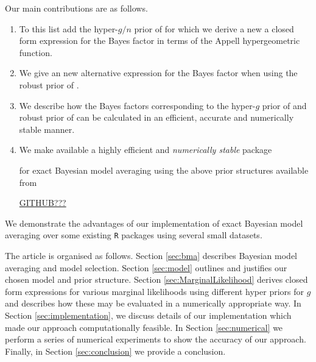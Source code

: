 \documentclass{article}[12pt]
\begin{document}
Our main contributions are as follows.
\begin{enumerate}
	\item To this list add the  hyper-$g/n$ prior of \cite{Liang2008} for which we
	derive a new
	a closed form expression for the Bayes factor in terms
	of the Appell hypergeometric function.
	
	\item We give an new alternative expression for the Bayes factor when using the
	robust prior of \cite{Bayarri2012}.
	
	\item We describe how the  Bayes factors corresponding to the hyper-$g$ prior of \cite{Liang2008} and robust 
	prior of \cite{Bayarri2012} can be calculated in an efficient, accurate and numerically stable manner.
	
	\item We make available a highly efficient and {\it numerically stable} package 
	

	for exact Bayesian model averaging
	using the above prior structures available from
	
	\begin{center}
	\url{GITHUB???}
	\end{center}
\end{enumerate}

\noindent 
We demonstrate the advantages of our implementation of exact Bayesian model
averaging over some existing {\tt R}
packages using several small datasets.



The article is organised as follows. Section \ref{sec:bma} describes Bayesian model averaging and model
selection. Section \ref{sec:model} outlines and justifies our chosen model and prior structure. Section 
\ref{sec:MarginalLikelihood} derives closed form expressions for various marginal likelihoods using 
different hyper priors for $g$ and describes how these may be evaluated in a numerically appropriate way.
In Section \ref{sec:implementation}, we discuss details of our implementation which made our approach 
computationally feasible.
In Section \ref{sec:numerical} we perform a series of numerical experiments to show the accuracy of our approach. 
Finally, in Section \ref{sec:conclusion} we provide a conclusion.
\end{document}
